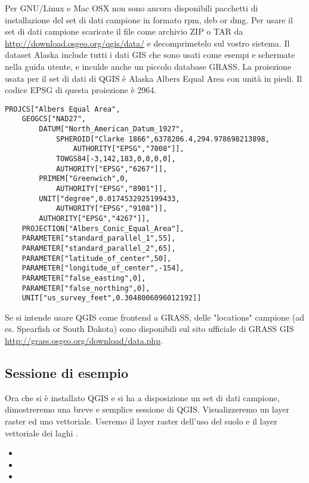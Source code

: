 \nix \osx Per GNU/Linux e Mac OSX non sono ancora disponibili pacchetti
di installazione del set di dati campione in formato rpm, deb or dmg.
Per usare il set di dati campione scaricate il file 
come archivio ZIP o TAR da \url{http://download.osgeo.org/qgis/data/}
e decomprimetelo sul vostro sistema. Il dataset Alaska include tutti
i dati GIS che sono usati come esempi e schermate nella guida utente,
e inculde anche un piccolo database GRASS. La proiezione usata per
il set di dati di QGIS è Alaska Albers Equal Area con unità in piedi.
Il codice EPSG di questa proiezione è 2964.

\begin{verbatim}
PROJCS["Albers Equal Area",
    GEOGCS["NAD27",
        DATUM["North_American_Datum_1927",
            SPHEROID["Clarke 1866",6378206.4,294.978698213898,
                AUTHORITY["EPSG","7008"]],
            TOWGS84[-3,142,183,0,0,0,0],
            AUTHORITY["EPSG","6267"]],
        PRIMEM["Greenwich",0,
            AUTHORITY["EPSG","8901"]],
        UNIT["degree",0.0174532925199433,
            AUTHORITY["EPSG","9108"]],
        AUTHORITY["EPSG","4267"]],
    PROJECTION["Albers_Conic_Equal_Area"],
    PARAMETER["standard_parallel_1",55],
    PARAMETER["standard_parallel_2",65],
    PARAMETER["latitude_of_center",50],
    PARAMETER["longitude_of_center",-154],
    PARAMETER["false_easting",0],
    PARAMETER["false_northing",0],
    UNIT["us_survey_feet",0.3048006096012192]]
\end{verbatim}

Se si intende usare QGIS come frontend a GRASS, delle "locations" campione
(ad es. Spearfish or South Dakota) sono disponibili sul sito ufficiale
di GRASS GIS \url{http://grass.osgeo.org/download/data.php}.

\subsection{Sessione di esempio}\label{samplesession}

Ora che si è installato QGIS e si ha a disposizione un set di dati
campione, dimostreremo una breve e semplice sessione di QGIS. Visualizzeremo
un layer raster ed uno vettoriale. Useremo il layer raster dell'uso
del suolo  e
il layer vettoriale dei laghi .


\begin{itemize}
\item {} 
\item {} 
\item {}
\end{itemize} 

